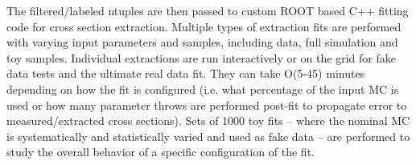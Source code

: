 \documentclass[../main-v1.tex]{subfiles}
\begin{document}
The filtered/labeled ntuples are then passed to custom  ROOT based C++ fitting code for cross section extraction. Multiple types of extraction fits are performed with varying input parameters and samples, including data, full simulation and toy samples.  
Individual extractions are run interactively or on the grid for fake data tests and the ultimate real data fit. They can take O(5-45) minutes depending on how the fit is configured (i.e. what percentage of the input MC is used or how many parameter throws are performed post-fit to propagate error to measured/extracted cross sections). Sets of 1000 toy fits – where the nominal MC is systematically and statistically varied and used as fake data – are performed to study the overall behavior of a specific configuration of the fit.











\end{document}
